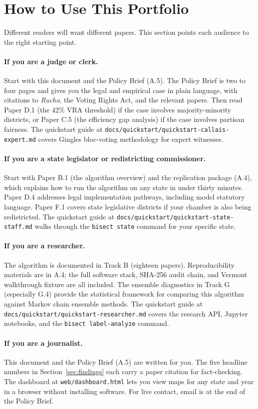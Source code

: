 
\section{How to Use This Portfolio}

Different readers will want different papers.
This section points each audience to the right starting point.

\paragraph{If you are a judge or clerk.}
Start with this document and the Policy Brief (A.5).
The Policy Brief is two to four pages and gives you the legal and
empirical case in plain language, with citations to \emph{Rucho},
the Voting Rights Act, and the relevant papers.
Then read Paper D.1 (the 42\% VRA threshold) if the case involves
majority-minority districts, or Paper C.5 (the efficiency gap analysis)
if the case involves partisan fairness.
The quickstart guide at \texttt{docs/quickstart/quickstart-callais-expert.md}
covers Gingles bloc-voting methodology for expert witnesses.

\paragraph{If you are a state legislator or redistricting commissioner.}
Start with Paper B.1 (the algorithm overview) and the replication
package (A.4), which explains how to run the algorithm on any state
in under thirty minutes.
Paper D.4 addresses legal implementation pathways, including model
statutory language.
Paper F.1 covers state legislative districts if your chamber is also
being redistricted.
The quickstart guide at \texttt{docs/quickstart/quickstart-state-staff.md}
walks through the \texttt{bisect state} command for your specific state.

\paragraph{If you are a researcher.}
The algorithm is documented in Track B (eighteen papers).
Reproducibility materials are in A.4; the full software stack,
SHA-256 audit chain, and Vermont walkthrough fixture are all included.
The ensemble diagnostics in Track G (especially G.4) provide
the statistical framework for comparing this algorithm against
Markov chain ensemble methods.
The quickstart guide at \texttt{docs/quickstart/quickstart-researcher.md}
covers the research API, Jupyter notebooks, and the
\texttt{bisect label-analyze} command.

\paragraph{If you are a journalist.}
This document and the Policy Brief (A.5) are written for you.
The five headline numbers in Section~\ref{sec:findings} each carry
a paper citation for fact-checking.
The dashboard at \texttt{web/dashboard.html} lets you view maps
for any state and year in a browser without installing software.
For live contact, email is at the end of the Policy Brief.
